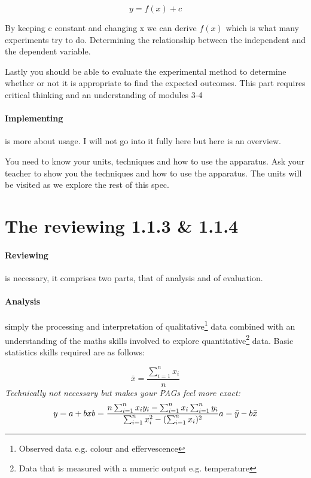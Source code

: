 \documentclass[11pt,a4paper]{memoir}
\newcommand*\mean[1]{\bar{#1}}
\begin{document}
	\begin{center}
	\[y= f(x) + c\]
	\end{center}
	
	By keeping c constant and changing x we can derive $f(x)$ which is what many experiments try to do. Determining the relationship between the independent and the dependent variable.
	
	Lastly you should be able to evaluate the experimental method to determine whether or not it is appropriate to find the expected outcomes. This part requires critical thinking and an understanding of modules 3-4
	
	\paragraph{Implementing} is more about usage. I will not go into it fully here but here is an overview.
	
	You need to know your units, techniques and how to use the apparatus. Ask your teacher to show you the techniques and how to use the apparatus. The units will be visited as we explore the rest of this spec.
	
\section{The reviewing 1.1.3 \& 1.1.4}
	
	\paragraph{Reviewing} is necessary, it comprises two parts, that of analysis and of evaluation.
	
	\paragraph{Analysis} simply the processing and interpretation of qualitative\footnote{Observed data e.g. colour and effervescence} data combined with an understanding of the maths skills involved to explore quantitative\footnote{Data that is measured with a numeric output e.g. temperature} data. Basic statistics skills required are as follows:
	
	\begin{center}
		\begin{equation}
		\mean{x} = \frac{\sum_{i=1}^n x_i}{n}
		\end{equation}
		\textit{Technically not necessary but makes your PAGs feel more exact:}
		\begin{equation}
		y=a + bx \newline
		b=\frac{n\sum_{i=1}^n x_iy_i - \sum_{i=1}^n x_i \sum_{i=1}^n y_i}{\sum_{i=1}^n x^2_i -(\sum_{i=1}^n x_i)^2} \newline
		a = \mean{y} - b\mean{x}
		\end{equation}
	\end{center}
	
\end{document}
